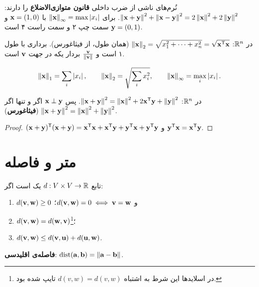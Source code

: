\begin{note}
نُرم‌های ناشی از ضرب داخلی \textbf{قانون متوازی‌الاضلاع} را دارند: $\norm{\vx+\vy}^2+\norm{\vx-\vy}^2=2\norm{\vx}^2+2\norm{\vy}^2$. برای $\norm{\vx}_\infty=\max\abs{x_i}$ با $\vx=(1,0)$ و $\vy=(0,1)$ سمت چپ ۲ و سمت راست ۴ است.
\end{note}

\begin{definition}[نُرم اقلیدسی]
 در $\R^n$: $\norm{\vx}_2=\sqrt{x_1^2+\dots+x_n^2}=\sqrt{\vx\T\vx}$ (همان طول، از فیثاغورس). برداری با طول ۱  است و $\frac{\vv}{\norm{\vv}}$ بردار یکه  در جهت $\vv$ است.
\end{definition}

\begin{intuition}
\[
\norm{\vx}_1=\sum_i\abs{x_i},\qquad \norm{\vx}_2=\sqrt{\sum_ix_i^2},\qquad \norm{\vx}_\infty=\max_i\abs{x_i}.
\]
\begin{center}
\end{center}
\end{intuition}

\begin{theorem}[نُرم مجموع]\label{thm:norm-sum}
در $\R^n$: $\norm{\vx+\vy}^2=\norm{\vx}^2+2\vx\T\vy+\norm{\vy}^2$. پس $\vx\perp\vy$ اگر و تنها اگر $\norm{\vx+\vy}^2=\norm{\vx}^2+\norm{\vy}^2$ (\textbf{فیثاغورس}).
\end{theorem}
\begin{proof}
$(\vx+\vy)\T(\vx+\vy)=\vx\T\vx+\vx\T\vy+\vy\T\vx+\vy\T\vy$ و $\vy\T\vx=\vx\T\vy$.
\end{proof}

\section{متر و فاصله}

\begin{definition}[متر]
تابع $d:V\times V\to\R$ یک  است اگر:
\begin{enumerate}[label=(\roman*)]
  \item $d(\vv,\vw)\ge0$ و $d(\vv,\vw)=0\iff\vv=\vw$؛
  \item $d(\vv,\vw)=d(\vw,\vv)$؛\footnote{در اسلایدها این شرط به اشتباه $d(v,w)=d(v,w)$ تایپ شده بود.}
  \item $d(\vv,\vw)\le d(\vv,\vu)+d(\vu,\vw)$.
\end{enumerate}
\textbf{فاصله‌ی اقلیدسی}: $\dist(\va,\vb)=\norm{\va-\vb}$.
\end{definition}

